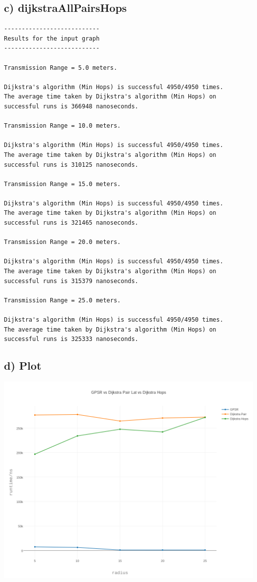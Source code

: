 \documentclass{article}
\begin{document}
\subsection*{c) dijkstraAllPairsHops}
\begin{verbatim}
---------------------------
Results for the input graph
---------------------------

Transmission Range = 5.0 meters.

Dijkstra's algorithm (Min Hops) is successful 4950/4950 times.
The average time taken by Dijkstra's algorithm (Min Hops) on successful runs is 366948 nanoseconds.

Transmission Range = 10.0 meters.

Dijkstra's algorithm (Min Hops) is successful 4950/4950 times.
The average time taken by Dijkstra's algorithm (Min Hops) on successful runs is 310125 nanoseconds.

Transmission Range = 15.0 meters.

Dijkstra's algorithm (Min Hops) is successful 4950/4950 times.
The average time taken by Dijkstra's algorithm (Min Hops) on successful runs is 321465 nanoseconds.

Transmission Range = 20.0 meters.

Dijkstra's algorithm (Min Hops) is successful 4950/4950 times.
The average time taken by Dijkstra's algorithm (Min Hops) on successful runs is 315379 nanoseconds.

Transmission Range = 25.0 meters.

Dijkstra's algorithm (Min Hops) is successful 4950/4950 times.
The average time taken by Dijkstra's algorithm (Min Hops) on successful runs is 325333 nanoseconds.
\end{verbatim}

\subsection*{d) Plot}
\includegraphics[width=\linewidth]{../graph/plot.png}
\end{document}

